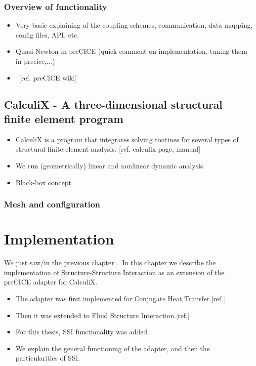 \documentclass[a4paper, 11pt, oneside]{Thesis}  %
\begin{document}
        \subsection{Overview of functionality}
        
        \begin{itemize}
            \item Very basic explaining of the coupling schemes, communication, data mapping, config files, API, etc.
            \item Quasi-Newton in preCICE (quick comment on implementation, tuning them in precice,...)
            \item ~[ref. preCICE wiki]
        \end{itemize}
    
    
    \section{CalculiX - A three-dimensional structural finite element program}
    
        \begin{itemize}
            \item CalculiX is a program that integrates solving routines for several types of structural finite element analysis. [ref. calculix page, manual]
            \item We run (geometrically) linear and nonlinear dynamic analysis.
            \item Black-box concept
        \end{itemize}
    
        \subsection{Mesh and configuration}
    

\chapter{Implementation}

    We just saw/in the previous chapter...
    In this chapter we describe the implementation of Structure-Structure Interaction as an extension of the preCICE adapter for CalculiX.

    \begin{itemize}
        \item The adapter was first implemented for Conjugate Heat Transfer.[ref.]
        \item Then it was extended to Fluid Structure Interaction.[ref.]
        \item For this thesis, SSI functionality was added.
        \item We explain the general functioning of the adapter, and then the particularities of SSI.
    \end{itemize}
    
\end{document}
